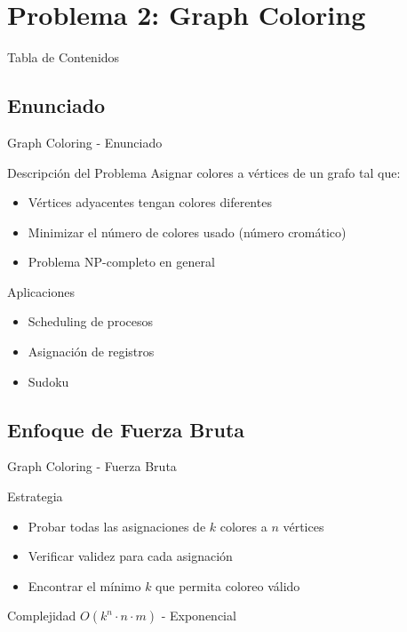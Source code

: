 \documentclass[aspectratio=169]{beamer}
\begin{document}
\section{Problema 2: Graph Coloring}

\begin{frame}{Tabla de Contenidos}
\end{frame}

\subsection{Enunciado}
\begin{frame}{Graph Coloring - Enunciado}
\begin{block}{Descripción del Problema}
Asignar colores a vértices de un grafo tal que:
\begin{itemize}
\item Vértices adyacentes tengan colores diferentes
\item Minimizar el número de colores usado (número cromático)
\item Problema NP-completo en general
\end{itemize}
\end{block}

\begin{exampleblock}{Aplicaciones}
\begin{itemize}
\item Scheduling de procesos
\item Asignación de registros
\item Sudoku
\end{itemize}
\end{exampleblock}
\end{frame}

\subsection{Enfoque de Fuerza Bruta}
\begin{frame}{Graph Coloring - Fuerza Bruta}
\begin{block}{Estrategia}
\begin{itemize}
\item Probar todas las asignaciones de $k$ colores a $n$ vértices
\item Verificar validez para cada asignación
\item Encontrar el mínimo $k$ que permita coloreo válido
\end{itemize}
\end{block}

\begin{alertblock}{Complejidad}
$O(k^n \cdot n \cdot m)$ - Exponencial
\end{alertblock}
\end{frame}
\end{document}
